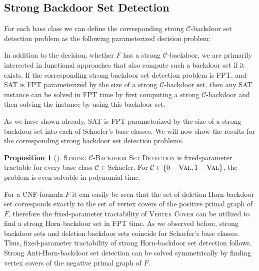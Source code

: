 \documentclass[11pt,a4paper]{article}
\makeatletter
\newcommand{\problemtitle}[1]{\gdef\@problemtitle{#1}}%
\newcommand{\probleminput}[1]{\gdef\@probleminput{#1}}%
\newcommand{\problemquestion}[1]{\gdef\@problemquestion{#1}}%
\newcommand{\problemparam}[1]{\gdef\@problemparam{#1}}%
\theoremstyle{definition}
\theoremstyle{proposition}
\newtheorem{proposition}{Proposition}[section]
\makeatother
\begin{document}
\subsection{Strong Backdoor Set Detection}
\label{sec:strongdetection}
For each base class we can define the corresponding strong $\mathcal{C}$-backdoor set detection problem as the following parameterized decision problem: 
\begin{csproblemparam}
        \problemtitle{Strong $\mathcal{C}$-Backdoor Set Detection}
        \probleminput{A CNF formula $F$ and an integer $k \geq 0$}
        \problemparam{The integer $k$}
        \problemquestion{Does $F$ have a strong $\mathcal{C}$-backdoor set of size at most $k$?}
\end{csproblemparam}
In addition to the decision, whether $F$ has a strong $\mathcal{C}$-backdoor, we are primarily interested in functional approaches that also compute such a backdoor set if it exists. If the corresponding strong backdoor set detection problem is FPT, and SAT is FPT parameterized by the size of a strong $\mathcal{C}$-backdoor set, then any SAT instance can be solved in FPT time by first computing a strong $\mathcal{C}$-backdoor and then solving the instance by using this backdoor set. 

As we have shown already, SAT is FPT parameterized by the size of a strong backdoor set into each of Schaefer's base classes. We will now show the results for the corresponding strong backdoor set detection problems.
\begin{proposition}[{\cite{Nishimura}}]
\textsc{Strong $\mathcal{C}$-Backdoor Set Detection} is fixed-parameter tractable for every base class $\mathcal{C} \in \text{Schaefer}$. For $\mathcal{C} \in \{0-\textsc{Val}, 1-\textsc{Val}\}$, the problem is even solvable in polynomial time. 
\end{proposition}

For a CNF-formula $F$ it can easily be seen that the set of deletion Horn-backdoor set corresponds exactly to the set of vertex covers of the positive primal graph of $F$, therefore the fixed-parameter tractability of \textsc{Vertex Cover} can be utilized to find a strong Horn-backdoor set in FPT time. As we observed before, strong backdoor sets and deletion backdoor sets coincide for Schaefer's base classes. Thus, fixed-parameter tractability of strong Horn-backdoor set detection follows. Strong Anti-Horn-backdoor set detection can be solved symmetrically by finding vertex covers of the negative primal graph of $F$.  
\end{document}
